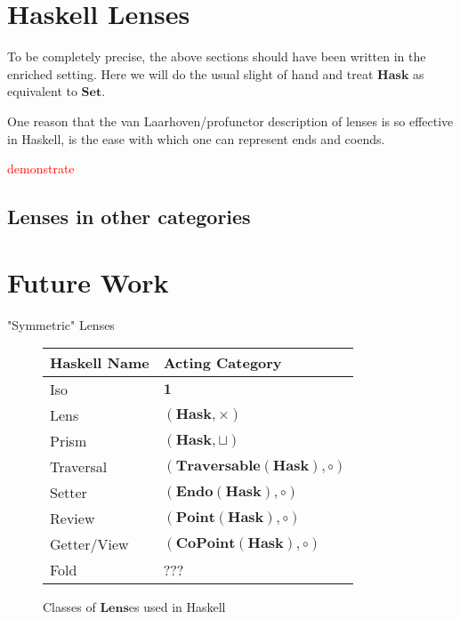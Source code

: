 \documentclass[11pt,a4paper]{amsart}
\theoremstyle{plain}
\theoremstyle{definition}
\newcommand{\Set}{\mathbf{Set}}
\newcommand{\Lens}{\mathbf{Lens}}
\newcommand{\Hask}{\mathbf{Hask}}
\newcommand{\Endo}{\mathbf{Endo}}
\newcommand{\Point}{\mathbf{Point}}
\newcommand{\CoPoint}{\mathbf{CoPoint}}
\newcommand{\Traversable}{\mathbf{Traversable}}
\newcommand{\todo}[1]{\textcolor{red}{\small #1}}
\begin{document}
\section{Haskell Lenses}
To be completely precise, the above sections should have been written in the enriched setting. Here we will do the usual slight of hand and treat $\Hask$ as equivalent to $\Set$.

One reason that the van Laarhoven/profunctor description of lenses is so effective in Haskell, is the ease with which one can represent ends and coends.

\todo{demonstrate}

\subsection{Lenses in other categories}

\section{Future Work}

"Symmetric" Lenses



\begin{figure}[b]
\begin{tabular}{ll}
\hline
Haskell Name & Acting Category \\
\hline
Iso & $\mathbf{1}$ \\
Lens & $(\Hask, \times)$ \\
Prism & $(\Hask, \sqcup)$ \\
Traversal & $(\Traversable(\Hask), \circ)$ \\
Setter & $(\Endo(\Hask), \circ)$ \\
Review & $(\Point(\Hask), \circ)$ \\
Getter/View & $(\CoPoint(\Hask), \circ)$ \\
Fold & ??? \\
\hline
\end{tabular}
\caption{Classes of $\Lens$es used in Haskell}
\end{figure}
\end{document}
